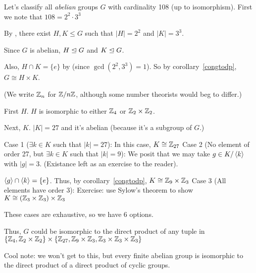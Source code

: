 \documentclass[notes.tex]{subfiles}
\begin{document}
\begin{eg}
	Let's classify all \emph{abelian} groups $G$ with cardinality 108 (up to isomorphism). First we note that $108 =2^2\cdot 3^3$

	By , there exist $H, K\le G$ such that $|H| = 2^2$ and $|K| = 3^3$.

	Since $G$ is abelian, $H\trianglelefteq G$ and $K\trianglelefteq G$.

	Also, $H\cap K = \{e\}$ by  (since $\gcd(2^2, 3^3)=1$). So by corollary~\ref{congtodp}, $G\cong H\times K$. 

	(We write $\mathbb{Z}_n$ for $\mathbb{Z}/n\mathbb{Z}$, although some number theorists would beg to differ.)

	First $H$. $H$ is isomorphic to either $\mathbb{Z}_4$ or $\mathbb{Z}_2\times\mathbb{Z}_2$.

	Next, $K$. $|K| = 27$ and it's abelian (because it's a subgroup of $G$.)

	Case 1 ($\exists k\in K$ such that $|k| = 27$):
	\tabin
		In this case, $K\cong\mathbb{Z}_{27}$
	\tabout
	Case 2 (No element of order 27, but $\exists k\in K$ such that $|k| = 9$):
	\tabin
		We posit that we may take $g\in K/\left\langle{k}\right\rangle$ with $|g| = 3$. (Existance left as an exercise to the reader).

		$\left\langle{g}\right\rangle\cap \left\langle{k}\right\rangle = \{e\}$.
		Thus, by corollary~\ref{congtodp}, $K\cong \mathbb{Z}_9\times \mathbb{Z}_3$
	\tabout
	Case 3 (All elements have order 3):
	\tabin
		Exercise: use Sylow's theorem to show $K\cong (\mathbb{Z}_3\times\mathbb{Z}_3)\times\mathbb{Z}_3$
	\tabout

	These cases are exhaustive, so we have 6 options.

	Thus, $G$ could be isomorphic to the direct product of any tuple in 
	$\{\mathbb{Z}_4, \mathbb{Z}_2\times\mathbb{Z}_2\} \times \{\mathbb{Z}_{27}, \mathbb{Z}_9\times \mathbb{Z}_3, \mathbb{Z}_3\times\mathbb{Z}_3\times\mathbb{Z}_3\}$
\end{eg}

Cool note: we won't get to this, but every finite abelian group is isomorphic to the direct product of a direct product of cyclic groups.
\end{document}
